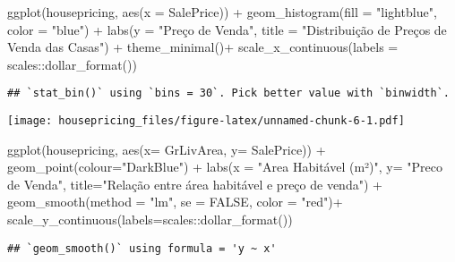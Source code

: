 \documentclass[
]{article}
\newenvironment{Shaded}{\begin{snugshade}}{\end{snugshade}}
\newcommand{\AttributeTok}[1]{\textcolor[rgb]{0.77,0.63,0.00}{#1}}
\newcommand{\ConstantTok}[1]{\textcolor[rgb]{0.00,0.00,0.00}{#1}}
\newcommand{\FunctionTok}[1]{\textcolor[rgb]{0.00,0.00,0.00}{#1}}
\newcommand{\NormalTok}[1]{#1}
\newcommand{\SpecialCharTok}[1]{\textcolor[rgb]{0.00,0.00,0.00}{#1}}
\newcommand{\StringTok}[1]{\textcolor[rgb]{0.31,0.60,0.02}{#1}}
\begin{document}
\begin{Shaded}
\begin{Highlighting}[]
\FunctionTok{ggplot}\NormalTok{(housepricing, }\FunctionTok{aes}\NormalTok{(}\AttributeTok{x =}\NormalTok{ SalePrice)) }\SpecialCharTok{+}
  \FunctionTok{geom\_histogram}\NormalTok{(}\AttributeTok{fill =} \StringTok{"lightblue"}\NormalTok{, }\AttributeTok{color =} \StringTok{"blue"}\NormalTok{) }\SpecialCharTok{+}
  \FunctionTok{labs}\NormalTok{(}\AttributeTok{y =} \StringTok{"Preço de Venda"}\NormalTok{, }\AttributeTok{title =} \StringTok{"Distribuição de Preços de Venda das Casas"}\NormalTok{) }\SpecialCharTok{+}
  \FunctionTok{theme\_minimal}\NormalTok{()}\SpecialCharTok{+}
  \FunctionTok{scale\_x\_continuous}\NormalTok{(}\AttributeTok{labels =}\NormalTok{ scales}\SpecialCharTok{::}\FunctionTok{dollar\_format}\NormalTok{())}
\end{Highlighting}
\end{Shaded}

\begin{verbatim}
## `stat_bin()` using `bins = 30`. Pick better value with `binwidth`.
\end{verbatim}

\texttt{[image: housepricing\_files/figure-latex/unnamed-chunk-6-1.pdf]}

\begin{Shaded}
\begin{Highlighting}[]
\FunctionTok{ggplot}\NormalTok{(housepricing, }\FunctionTok{aes}\NormalTok{(}\AttributeTok{x=}\NormalTok{ GrLivArea, }\AttributeTok{y=}\NormalTok{ SalePrice)) }\SpecialCharTok{+}
  \FunctionTok{geom\_point}\NormalTok{(}\AttributeTok{colour=}\StringTok{"DarkBlue"}\NormalTok{) }\SpecialCharTok{+}
  \FunctionTok{labs}\NormalTok{(}\AttributeTok{x =} \StringTok{"Area Habitável (m²)"}\NormalTok{, }\AttributeTok{y=} \StringTok{"Preco de Venda"}\NormalTok{, }\AttributeTok{title=}\StringTok{"Relação entre área habitável e preço de venda"}\NormalTok{) }\SpecialCharTok{+}
  \FunctionTok{geom\_smooth}\NormalTok{(}\AttributeTok{method =} \StringTok{"lm"}\NormalTok{, }\AttributeTok{se =} \ConstantTok{FALSE}\NormalTok{, }\AttributeTok{color =} \StringTok{"red"}\NormalTok{)}\SpecialCharTok{+}
  \FunctionTok{scale\_y\_continuous}\NormalTok{(}\AttributeTok{labels=}\NormalTok{scales}\SpecialCharTok{::}\FunctionTok{dollar\_format}\NormalTok{())}
\end{Highlighting}
\end{Shaded}

\begin{verbatim}
## `geom_smooth()` using formula = 'y ~ x'
\end{verbatim}
\end{document}
